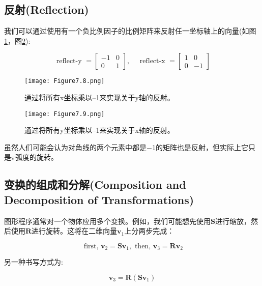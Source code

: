 \subsection{反射(Reflection)}

我们可以通过使用有一个负比例因子的比例矩阵来反射任一坐标轴上的向量(如图\ref{fig:7.8}，图\ref{fig:7.9}):

\begin{equation}
	\text { reflect-y }=\left[\begin{array}{rr}
		-1 & 0 \\
		0 & 1
	\end{array}\right], \quad \text { reflect-x }=\left[\begin{array}{rr}
		1 & 0 \\
		0 & -1
	\end{array}\right]
\nonumber
\end{equation}

\begin{figure}[htbp]
	\centering
	\texttt{[image: Figure7.8.png]}
	\caption{通过将所有x坐标乘以–1来实现关于y轴的反射。}
	\label{fig:7.8}
\end{figure}	

\begin{figure}[htbp]
	\centering
	\texttt{[image: Figure7.9.png]}
	\caption{通过将所有y坐标乘以–1来实现关于x轴的反射。}
	\label{fig:7.9}
\end{figure}	

虽然人们可能会认为对角线的两个元素中都是−1的矩阵也是反射，但实际上它只是$\pi$弧度的旋转。

\subsection{变换的组成和分解(Composition and Decomposition of Transformations)}

图形程序通常对一个物体应用多个变换。例如，我们可能想先使用$\mathbf{S}$进行缩放，然后使用$\mathbf{R}$进行旋转。这将在二维向量$\mathbf{v}_{1}$上分两步完成：

\begin{equation}
	\text { first, } \mathbf{v}_2=\mathbf{S} \mathbf{v}_1, \text { then, } \mathbf{v}_3=\mathbf{R v}_2
	\nonumber
\end{equation}

另一种书写方式为:

\begin{equation}
	\mathbf{v}_3=\mathbf{R}\left(\mathbf{S v}_1\right)
	\nonumber
\end{equation}

